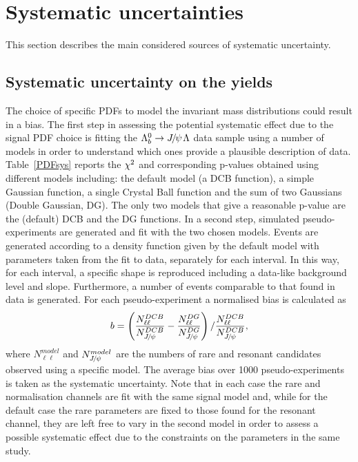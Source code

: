 \section{Systematic uncertainties}
\label{sec:Lb_sys}

This section describes the main considered sources of systematic uncertainty.

\subsection{Systematic uncertainty on the yields}
\label{sec:Lb_yield_sys}

The choice of specific PDFs to model the invariant mass distributions could result
in a bias. The first step in assessing the potential systematic effect due to the signal PDF choice is fitting 
 the $\Lb\to\jpsi\Lz$ data sample using a number of models in order to understand which ones provide a plausible 
 description of data. Table~\ref{PDFsys} reports the $\chi^2$ and corresponding p-values obtained using different
models including: the default model (a DCB function), a simple Gaussian function,
a single Crystal Ball function and the sum of two Gaussians (Double Gaussian, DG). The only two models that
give a reasonable p-value are the (default) DCB and the DG functions.
In a second step, simulated pseudo-experiments are generated and fit with the two chosen models.
Events are generated according to a density function given by the default model with parameters taken
from the fit to data, separately for each \qsq interval. In this way, for each \qsq interval, a specific
shape is reproduced including a data-like background level and slope. Furthermore, a number 
of events comparable to that found in data is generated. For each pseudo-experiment a normalised
bias is calculated as
%
\begin{equation}
b = \left(\frac{N^{DCB}_{\ell\ell}}{N^{DCB}_{\jpsi}} - \frac{N^{DG}_{\ell\ell}}{N^{DG}_{\jpsi}}\right) / \frac{N^{DCB}_{\ell\ell}}{N^{DCB}_{\jpsi}},
\end{equation}
%
where $N^{model}_{\ell\ell}$ and $N^{model}_{\jpsi}$ are the numbers of rare and resonant candidates
observed using a specific model. %
The average bias over 1000 pseudo-experiments is taken
as the systematic uncertainty. Note that in each case the rare and normalisation channels are fit
with the same signal model and, while for the default case the rare parameters are fixed to those found
for the resonant channel, they are left free to vary in the second model in order to assess
a possible systematic effect due to the constraints on the parameters in the same study.

